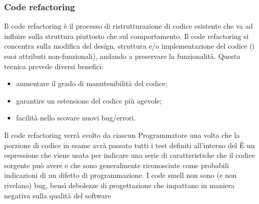 		
		\subsubsection{Code refactoring}
		Il code refactoring è il processo di ristrutturazione di codice esistente che va ad influire sulla struttura piuttosto che sul comportamento. Il code refactoring si concentra sulla
		modifica del design, struttura e/o implementazione del codice (i suoi attributi non-funzionali), andando a preservare la funzionalità.
		Questa tecnica prevede diversi benefici:
		\begin{itemize}
			\item aumentare il grado di manutenibilità del codice;
			\item garantire un estensione del codice più agevole;
			\item facilità nello scovare nuovi bug/errori.
		\end{itemize}
		Il code refactoring verrà svolto da ciascun Programmatore una volta che la porzione di 
		codice in esame avrà passato tutti i test definiti all'interno del \PdQ
			È un espressione che viene usata per indicare una serie di caratteristiche che il 
			codice sorgente può avere e che sono generalmente riconosciute come probabili indicazioni di un difetto di programmazione.
			I code smell non sono (e non rivelano) bug, bensì debolezze di progettazione
			che impattano in maniera negativa sulla qualità del software
		
